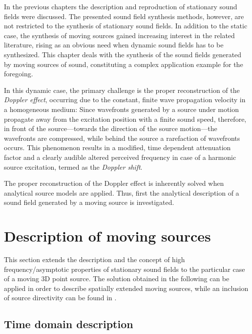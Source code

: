 In the previous chapters the description and reproduction of stationary sound fields were discussed.
The presented sound field synthesis methods, however, are not restricted to the synthesis of stationary sound fields.
In addition to the static case, the synthesis of moving sources gained increasing interest in the related literature, rising as an obvious need when dynamic sound fields has to be synthesized.
This chapter deals with the synthesis of the sound fields generated by moving sources of sound, constituting a complex application example for the foregoing.

In this dynamic case, the primary challenge is the proper reconstruction of the \emph{Doppler effect}, occurring due to the constant, finite wave propagation velocity in a homogeneous medium:
Since wavefronts generated by a source under motion propagate away from the excitation position with a finite sound speed, therefore, in front of the source---towards the direction of the source motion---the wavefronts are compressed, while behind the source a rarefaction of wavefronts occurs.
This phenomenon results in a modified, time dependent attenuation factor and a clearly audible altered perceived frequency in case of a harmonic source excitation, termed as the \emph{Doppler shift}.

The proper reconstruction of the Doppler effect is inherently solved when analytical source models are applied.
Thus, first the analytical description of a sound field generated by a moving source is investigated.

\section{Description of moving sources}

This section extends the description and the concept of high frequency/asymptotic properties of stationary sound fields to the particular case of a moving 3D point source.
The solution obtained in the following can be applied in order to describe spatially extended moving sources, while an inclusion of source directivity can be found in \cite{Warren1976, Ahrens2011_moving_source_WFS}.

\subsection{Time domain description}

